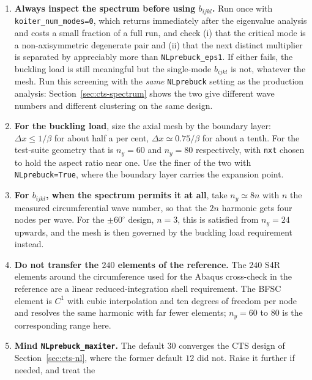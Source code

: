 \documentclass[11pt,a4paper]{article}
\begin{document}
\begin{enumerate}\itemsep4pt
  \item \textbf{Always inspect the spectrum before using $b_{ijkl}$.}
        Run once with \texttt{koiter\_num\_modes=0}, which returns
        immediately after the eigenvalue analysis and costs a small fraction
        of a full run, and check (i) that the critical mode is a
        non-axisymmetric degenerate pair and (ii) that the next distinct
        multiplier is separated by appreciably more than
        \texttt{NLprebuck\_eps1}.  If either fails, the buckling load is
        still meaningful but the single-mode $b_{ijkl}$ is not, whatever the
        mesh.  Run this screening with the \emph{same} \texttt{NLprebuck}
        setting as the production analysis: Section~\ref{sec:cts-spectrum}
        shows the two give different wave numbers and different clustering on
        the same design.
  \item \textbf{For the buckling load}, size the axial mesh by the boundary
        layer: $\Delta x \le 1/\beta$ for about half a per cent, $\Delta x
        \simeq 0.75/\beta$ for about a tenth.  For the test-suite geometry
        that is $n_y = 60$ and $n_y = 80$ respectively, with
        \texttt{nxt} chosen to hold the aspect ratio near one.  Use the
        finer of the two with \texttt{NLprebuck=True}, where the boundary
        layer carries the expansion point.
  \item \textbf{For $b_{ijkl}$, when the spectrum permits it at all}, take
        $n_y \simeq 8n$ with $n$ the measured circumferential wave
        number, so that the $2n$ harmonic gets four nodes per wave.  For the
        $\pm60^\circ$ design, $n = 3$, this is satisfied from $n_y = 24$
        upwards, and the mesh is then governed by the buckling load
        requirement instead.
  \item \textbf{Do not transfer the $240$ elements of the reference.}  The
        $240$ S4R elements around the circumference used for the Abaqus
        cross-check in the reference are a linear reduced-integration shell
        requirement.  The BFSC element is $C^1$ with cubic interpolation and
        ten degrees of freedom per node and resolves the same harmonic with
        far fewer elements; $n_y = 60$ to $80$ is the corresponding
        range here.
  \item \textbf{Mind \texttt{NLprebuck\_maxiter}.}  The default $30$
        converges the CTS design of Section~\ref{sec:cts-nl}, where the
        former default $12$ did not.  Raise it further if needed, and treat the

\end{enumerate}
\end{document}
